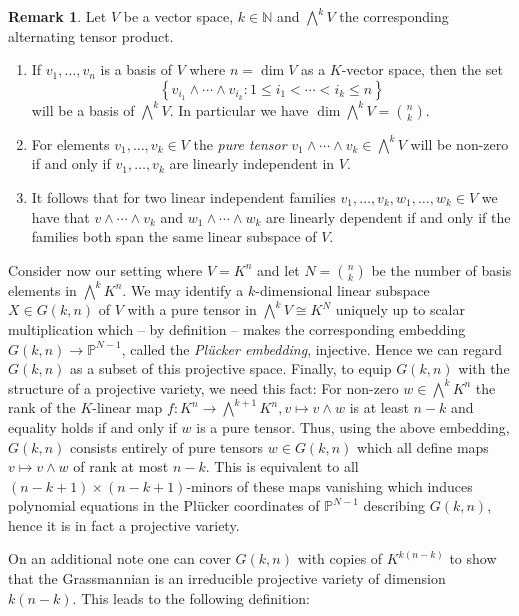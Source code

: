\documentclass[
  paper=a4,
  titlepage,
  bibliography=totoc,
  listof=totoc,
  pagesize=pdftex
]{scrartcl}
\numberwithin{figure}{section}
\numberwithin{equation}{section}
\numberwithin{table}{section}
\newcommand*\setN{\mathds{N}}
\newcommand*\setP{\mathds{P}}
\theoremstyle{definition}
\newtheorem{remark}[definition]{Remark}
\numberwithin{definition}{section}
\begin{document}
\begin{remark}
  Let $V$ be a vector space, $k \in \setN$ and $\bigwedge^k V$ the corresponding
  alternating tensor product.
  \begin{enumerate}
    \item If $v_1, \dots, v_n$ is a basis of $V$ where $n=\dim V$ as a $K$-vector space,
      then the set
      \[
        \left\{
          v_{i_1} \wedge \cdots \wedge v_{i_k} : 1\leq i_1 < \cdots < i_k \leq n
        \right\}
      \]
      will be a basis of $\bigwedge^kV$. In particular we have $\dim\bigwedge^kV = \binom
      nk$.
    \item For elements $v_1, \dots, v_k \in V$ the \emph{pure tensor} $v_1\wedge \cdots
      \wedge v_k \in \bigwedge^kV$ will be non-zero if and only if $v_1, \dots, v_k$ are
      linearly independent in $V$.
    \item It follows that for two linear independent families $v_1, \dots, v_k, w_1,
      \dots, w_k \in V$ we have that $v\wedge\cdots \wedge v_k$ and $w_1\wedge\cdots\wedge
      w_k$ are linearly dependent if and only if the families both span the same linear
      subspace of $V$.
  \end{enumerate}
\end{remark}

Consider now our setting where $V=K^n$ and let $N = \binom nk$ be the number of basis
elements in $\bigwedge^kK^n$. We may identify a $k$-dimensional linear subspace $X \in
G(k,n)$ of $V$ with a pure tensor in $\bigwedge^kV \cong K^N$ uniquely up to scalar
multiplication which -- by definition -- makes the corresponding embedding $G(k,n) \to
\setP^{N-1}$, called the \emph{Plücker embedding}, injective. Hence we can regard $G(k,n)$
as a subset of this projective space. Finally, to equip $G(k,n)$ with the structure of a
projective variety, we need this fact: For non-zero $w\in \bigwedge^kK^n$ the rank of the
$K$-linear map $f:K^n \to \bigwedge^{k+1}K^n, v \mapsto v \wedge w$ is at least $n-k$ and
equality holds if and only if $w$ is a pure tensor. Thus, using the above embedding,
$G(k,n)$ consists entirely of pure tensors $w\in G(k,n)$ which all define maps $v\mapsto
v\wedge w$ of rank at most $n-k$. This is equivalent to all $(n-k+1) \times
(n-k+1)$-minors of these maps vanishing which induces polynomial equations in the Plücker
coordinates of $\setP^{N-1}$ describing $G(k,n)$, hence it is in fact a projective
variety.

On an additional note one can cover $G(k,n)$ with copies of $K^{k(n-k)}$ to show that the
Grassmannian is an irreducible projective variety of dimension $k(n-k)$. This leads to the
following definition:
\end{document}
